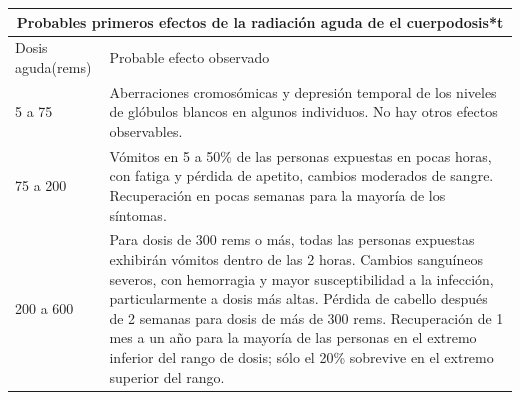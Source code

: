 \documentclass[]{article}
\begin{document}
\begin{table}[h!]
	\centering
	\begin{tabular}{||m{3cm}|m{30em}||}
		 \hline
		\multicolumn{2}{|c|}{Probables primeros efectos de la radiación aguda de el cuerpodosis*t} \\
		\hline	\hline
		Dosis aguda(rems)                                                            & Probable efecto observado                                                                                                                                                                                                                                                                                                                                                                                                                                           \\ \hline
		5 a 75                                                                       & Aberraciones cromosómicas y depresión temporal de los niveles de glóbulos blancos en algunos individuos. No hay otros efectos observables.                                                                                                                                                                                                                                                                                                                          \\ \hline
		75 a 200                                                                     & Vómitos en 5 a 50\% de las personas expuestas en pocas horas, con fatiga y pérdida de apetito, cambios moderados de sangre. Recuperación en pocas semanas para la mayoría de los síntomas.                                                                                                                                                                                                                                                                          \\ \hline
		200 a 600                                                                    & Para dosis de 300 rems o más, todas las personas expuestas exhibirán vómitos dentro de las 2 horas. Cambios sanguíneos severos, con hemorragia y mayor susceptibilidad a la infección, particularmente a dosis más altas. Pérdida de cabello después de 2 semanas para dosis de más de 300 rems. Recuperación de 1 mes a un año para la mayoría de las personas en el extremo inferior del rango de dosis; sólo el 20\% sobrevive en el extremo superior del rango. \\ \hline

\end{tabular}
\end{table}
\end{document}
